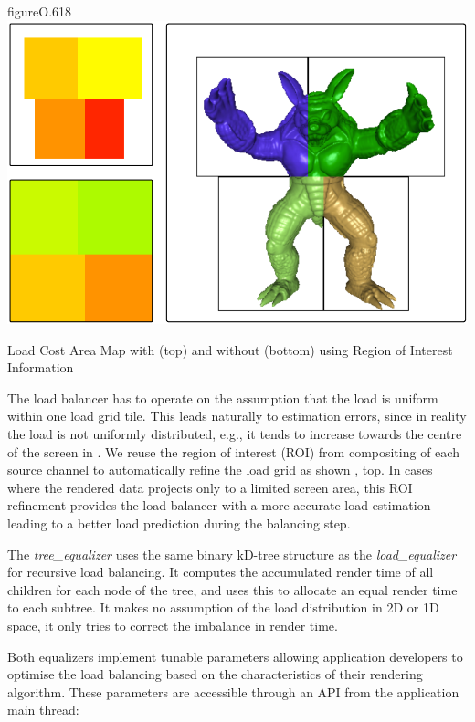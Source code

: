 \begin{wrapfloat}{figure}{O}{.618\textwidth}
  \includegraphics[width=.618\textwidth]{images/roi}
  \caption{Load Cost Area Map with (top) and without (bottom) using Region of Interest Information}
  \label{fROI}
\end{wrapfloat}

The load balancer has to operate on the assumption that the load is uniform
within one load grid tile. This leads naturally to estimation errors, since in
reality the load is not uniformly distributed, e.g., it tends to increase
towards the centre of the screen in . We reuse the region of interest
(ROI) from compositing of each source channel to automatically refine the load
grid as shown , top. In cases where the rendered data projects only
to a limited screen area, this ROI refinement provides the load balancer with a
more accurate load estimation leading to a better load prediction during the
balancing step.

The {\em tree\_equalizer} uses the same binary kD-tree structure as the
{\em load\_equalizer} for recursive load balancing. It computes the
accumulated render time of all children for each node of the tree, and uses
this to allocate an equal render time to each subtree. It makes no assumption
of the load distribution in 2D or 1D space, it only tries to correct the
imbalance in render time.

Both equalizers implement tunable parameters allowing application developers
to optimise the load balancing based on the characteristics of their rendering
algorithm. These parameters are accessible through an API from the application
main thread:

